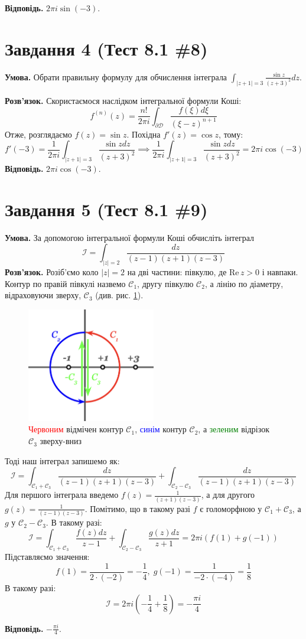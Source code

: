 \documentclass[14pt]{extarticle}
\begin{document}
\textbf{Відповідь.} $2\pi i \sin(-3)$. 

\section*{Завдання 4 (Тест 8.1 \#8)}
\textbf{Умова.} Обрати правильну формулу для обчислення інтеграла $\int_{|z+1|=3}\frac{\sin z}{(z+3)^2}dz$.

\textbf{Розв'язок.} Скористаємося наслідком інтегральної формули Коші:
\[
f^{(n)}(z) = \frac{n!}{2\pi i}\int_{\partial\mathcal{D}} \frac{f(\xi)d\xi}{(\xi - z)^{n+1}}
\]
Отже, розглядаємо $f(z) = \sin z$. Похідна $f'(z)=\cos z$, тому:
\[
f'(-3) = \frac{1}{2\pi i}\int_{|z+1|=3} \frac{\sin z dz}{(z+3)^2} \implies \frac{1}{2\pi i}\int_{|z+1|=3} \frac{\sin z dz}{(z+3)^2} = 2\pi i \cos (-3)
\]
\textbf{Відповідь.} $2\pi i \cos(-3)$.

\section*{Завдання 5 (Тест 8.1 \#9)}
\textbf{Умова.} За допомогою інтегральної формули Коші обчисліть інтеграл
\[
\mathcal{I} = \int_{|z|=2} \frac{dz}{(z-1)(z+1)(z-3)}
\]
\textbf{Розв'язок.} Розіб'ємо коло $|z|=2$ на дві частини: півкулю, де $\text{Re}\, z > 0$ і навпаки. Контур по правій півкулі назвемо $\mathcal{C}_1$, другу півкулю $\mathcal{C}_2$, а лінію по діаметру, відраховуючи зверху, $\mathcal{C}_3$ (див. рис. \ref{fig:2_2_5}).
\begin{figure}[H]
    \centering
    \includegraphics[width=0.5\textwidth]{images/hw_2/hw_2_2_5.png}
    \caption{\textcolor{red}{Червоним} відмічен контур $\mathcal{C}_1$, \textcolor{blue}{синім} контур $\mathcal{C}_2$, а \textcolor{green}{зеленим} відрізок $\mathcal{C}_3$ зверху-вниз}
    \label{fig:2_2_5}
\end{figure}

Тоді наш інтеграл запишемо як:
\[
\mathcal{I} = \int_{\mathcal{C}_1 + \mathcal{C}_3} \frac{dz}{(z-1)(z+1)(z-3)} + \int_{\mathcal{C}_2 - \mathcal{C}_3} \frac{dz}{(z-1)(z+1)(z-3)}
\]
Для першого інтеграла введемо $f(z) = \frac{1}{(z+1)(z-3)}$, а для другого $g(z) = \frac{1}{(z-1)(z-3)}$. Помітимо, що в такому разі $f$ є голоморфною у $\mathcal{C}_1 + \mathcal{C}_3$, а $g$ у $\mathcal{C}_2-\mathcal{C}_3$. В такому разі:
\[
\mathcal{I} = \int_{\mathcal{C}_1+\mathcal{C}_3} \frac{f(z)dz}{z-1} + \int_{\mathcal{C}_2-\mathcal{C}_3} \frac{g(z)dz}{z+1} = 2\pi i (f(1) + g(-1)) 
\]
Підставляємо значення:
\[
f(1) = \frac{1}{2 \cdot (-2)} = -\frac{1}{4}, \; g(-1) =\frac{1}{-2 \cdot (-4)} = \frac{1}{8}
\]
В такому разі:
\[
\mathcal{I} = 2\pi i \left(-\frac{1}{4} + \frac{1}{8}\right) = -\frac{\pi i}{4}
\]

\textbf{Відповідь.} $-\frac{\pi i}{4}$.
\end{document}
